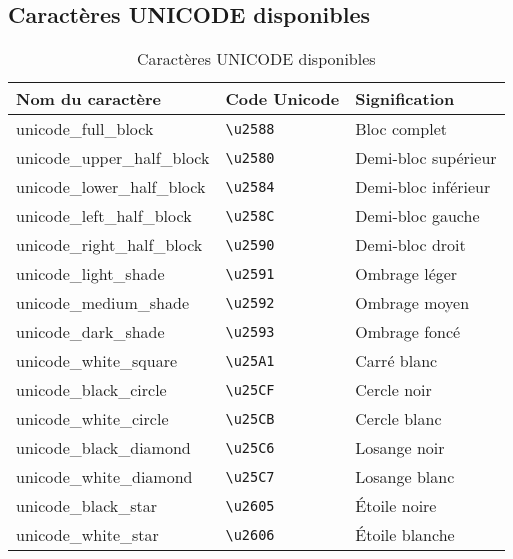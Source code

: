 \documentclass{article}
\begin{document}
\subsection{Caractères UNICODE disponibles}
\begin{table}[h!]
    \centering
    \renewcommand{\arraystretch}{1.5} %
    \footnotesize
    \begin{tabular}{|>{\centering\arraybackslash}m{4cm}|>{\centering\arraybackslash}m{2.3cm}|>{\centering\arraybackslash}m{3cm}|}
        \hline
        \textbf{Nom du caractère} & \textbf{Code Unicode} & \textbf{Signification} \\
        \hline
        unicode\_full\_block & \texttt{\textbackslash u2588} & Bloc complet \\
        \hline
        unicode\_upper\_half\_block & \texttt{\textbackslash u2580} & Demi-bloc supérieur \\
        \hline
        unicode\_lower\_half\_block & \texttt{\textbackslash u2584} & Demi-bloc inférieur \\
        \hline
        unicode\_left\_half\_block & \texttt{\textbackslash u258C} & Demi-bloc gauche \\
        \hline
        unicode\_right\_half\_block & \texttt{\textbackslash u2590} & Demi-bloc droit \\
        \hline
        unicode\_light\_shade & \texttt{\textbackslash u2591} & Ombrage léger \\
        \hline
        unicode\_medium\_shade & \texttt{\textbackslash u2592} & Ombrage moyen \\
        \hline
        unicode\_dark\_shade & \texttt{\textbackslash u2593} & Ombrage foncé \\
        \hline
        unicode\_white\_square & \texttt{\textbackslash u25A1} & Carré blanc \\
        \hline
        unicode\_black\_circle & \texttt{\textbackslash u25CF} & Cercle noir \\
        \hline
        unicode\_white\_circle & \texttt{\textbackslash u25CB} & Cercle blanc \\
        \hline
        unicode\_black\_diamond & \texttt{\textbackslash u25C6} & Losange noir \\
        \hline
        unicode\_white\_diamond & \texttt{\textbackslash u25C7} & Losange blanc \\
        \hline
        unicode\_black\_star & \texttt{\textbackslash u2605} & Étoile noire \\
        \hline
        unicode\_white\_star & \texttt{\textbackslash u2606} & Étoile blanche \\
        \hline
    \end{tabular}
    \label{tab:unicode}
    \caption{Caractères UNICODE disponibles}
\end{table}
\end{document}
